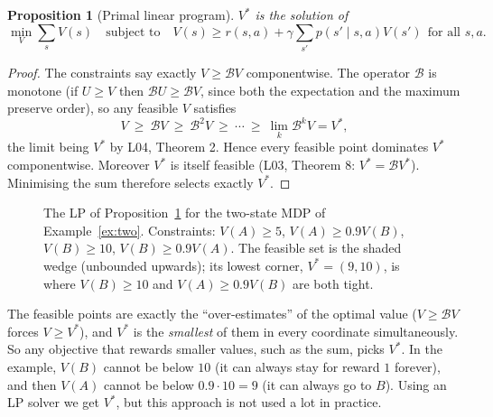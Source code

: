 \documentclass[11pt,a4paper]{article}
\newcommand{\B}{\mathcal{B}}
\theoremstyle{plain}
\newtheorem{proposition}[theorem]{Proposition}
\theoremstyle{definition}
\theoremstyle{remark}
\begin{document}
\begin{proposition}[Primal linear program]\label{prop:lp}
$V^*$ is the solution of
\[
\min_V\sum_sV(s)\quad\text{subject to}\quad V(s)\ge r(s,a)+\gamma\sum_{s'}p(s'\mid s,a)V(s')\ \ \text{for all }s,a.
\]
\end{proposition}
\begin{proof}
The constraints say exactly $V\ge\B V$ componentwise. The operator $\B$ is monotone (if $U\ge V$ then $\B U\ge\B V$, since both the expectation and the maximum preserve order), so any feasible $V$ satisfies
\[
V\ \ge\ \B V\ \ge\ \B^2V\ \ge\ \cdots\ \ge\ \lim_k\B^kV=V^*,
\]
the limit being $V^*$ by L04, Theorem 2. Hence every feasible point dominates $V^*$ componentwise. Moreover $V^*$ is itself feasible (L03, Theorem 8: $V^*=\B V^*$). Minimising the sum therefore selects exactly $V^*$.
\end{proof}

\begin{figure}[h]
\centering
{}
\caption{The LP of Proposition~\ref{prop:lp} for the two-state MDP of Example~\ref{ex:two}. Constraints: $V(A)\ge5$, $V(A)\ge0.9V(B)$, $V(B)\ge10$, $V(B)\ge0.9V(A)$. The feasible set is the shaded wedge (unbounded upwards); its lowest corner, $V^*=(9,10)$, is where $V(B)\ge10$ and $V(A)\ge0.9V(B)$ are both tight.}
\end{figure}

\begin{intuition}
The feasible points are exactly the ``over-estimates'' of the optimal value ($V\ge\B V$ forces $V\ge V^*$), and $V^*$ is the \emph{smallest} of them in every coordinate simultaneously. So any objective that rewards smaller values, such as the sum, picks $V^*$. In the example, $V(B)$ cannot be below $10$ (it can always stay for reward $1$ forever), and then $V(A)$ cannot be below $0.9\cdot10=9$ (it can always go to $B$). Using an LP solver we get $V^*$, but this approach is not used a lot in practice.
\end{intuition}
\end{document}

